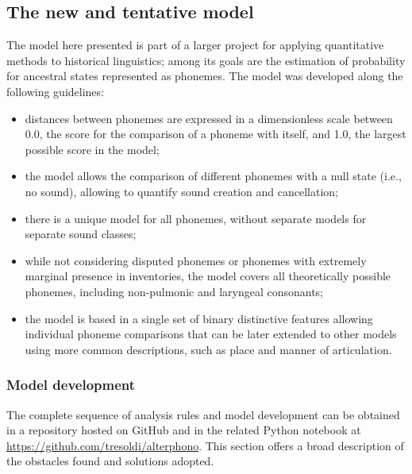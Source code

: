 \documentclass[a4paper]{article}
\begin{document}
\subsection{The new and tentative
model}\label{the-new-and-tentative-model}

The model here presented is part of a larger project for applying
quantitative methods to historical linguistics; among its goals are the
estimation of probability for ancestral states represented as phonemes.
The model was developed along the following guidelines:

\begin{itemize}
\item
  distances between phonemes are expressed in a dimensionless scale
  between 0.0, the score for the comparison of a phoneme with itself,
  and 1.0, the largest possible score in the model;
\item
  the model allows the comparison of different phonemes with a null
  state (i.e., no sound), allowing to quantify sound creation and
  cancellation;
\item
  there is a unique model for all phonemes, without separate models for
  separate sound classes;
\item
  while not considering disputed phonemes or phonemes with extremely
  marginal presence in inventories, the model covers all theoretically
  possible phonemes, including non-pulmonic and laryngeal consonants;
\item
  the model is based in a single set of binary distinctive features
  allowing individual phoneme comparisons that can be later extended to
  other models using more common descriptions, such as place and manner
  of articulation.
\end{itemize}

\subsubsection{Model development}\label{model-development}

The complete sequence of analysis rules and model development can be
obtained in a repository hosted on GitHub and in the related Python
notebook at \url{https://github.com/tresoldi/alterphono}. This section offers
a broad description of the obstacles found and solutions adopted.
\end{document}
